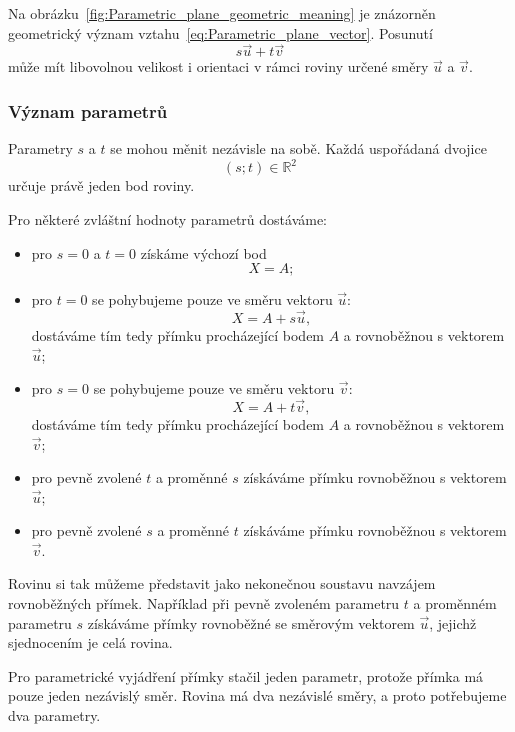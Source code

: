 Na obrázku~\ref{fig:Parametric_plane_geometric_meaning} je znázorněn
geometrický význam vztahu~\eqref{eq:Parametric_plane_vector}.
Posunutí
\[
    s\vec{u}+t\vec{v}
\]
může mít libovolnou velikost i orientaci v rámci roviny určené směry
$\vec{u}$ a $\vec{v}$.


\subsubsection{Význam parametrů}
\label{subsubsec:Meaning_of_plane_parameters}

Parametry $s$ a $t$ se mohou měnit nezávisle na sobě. Každá uspořádaná
dvojice
\[
    (s;t)\in\mathbb{R}^2
\]
určuje právě jeden bod roviny.

Pro některé zvláštní hodnoty parametrů dostáváme:

\begin{itemize}
    \item pro $s=0$ a $t=0$ získáme výchozí bod
    \[
        X=A;
    \]

    \item pro $t=0$ se pohybujeme pouze ve směru vektoru $\vec{u}$:
    \[
        X=A+s\vec{u},
    \]
    dostáváme tím tedy přímku procházející bodem $A$ a rovnoběžnou s vektorem $\vec{u}$;

    \item pro $s=0$ se pohybujeme pouze ve směru vektoru $\vec{v}$:
    \[
        X=A+t\vec{v},
    \]
    dostáváme tím tedy přímku procházející bodem $A$ a rovnoběžnou s vektorem $\vec{v}$;

    \item pro pevně zvolené $t$ a proměnné $s$ získáváme přímku
    rovnoběžnou s vektorem $\vec{u}$;

    \item pro pevně zvolené $s$ a proměnné $t$ získáváme přímku
    rovnoběžnou s vektorem $\vec{v}$.
\end{itemize}

Rovinu si tak můžeme představit jako nekonečnou soustavu navzájem
rovnoběžných přímek. Například při pevně zvoleném parametru $t$
a proměnném parametru $s$ získáváme přímky rovnoběžné se směrovým
vektorem $\vec{u}$, jejichž sjednocením je celá rovina.

\begin{remark}
    Pro parametrické vyjádření přímky stačil jeden parametr, protože
    přímka má pouze jeden nezávislý směr. Rovina má dva nezávislé
    směry, a proto potřebujeme dva parametry.
\end{remark}


